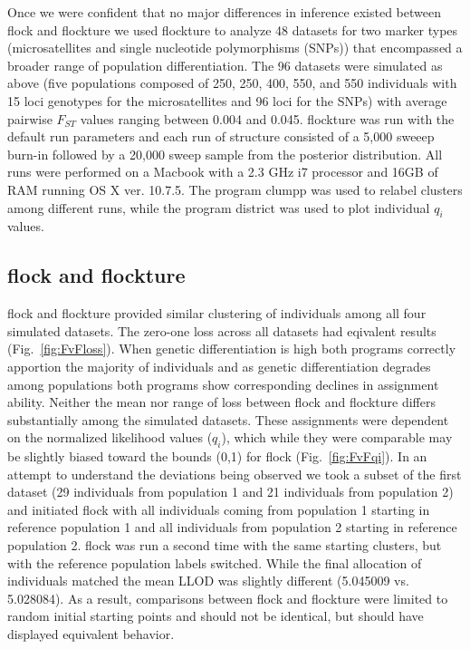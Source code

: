 Once we were confident that no major differences in inference existed between 
{\sc flock} and {\sc flockture} we used {\sc flockture} to analyze 48 datasets for two marker types 
(microsatellites and single nucleotide polymorphisms (SNPs))  that encompassed a broader 
range of population differentiation. The 96 datasets were simulated as above (five populations 
composed of 250, 250, 400, 550, and 550 individuals with 15 loci genotypes for the microsatellites
and 96 loci for the SNPs)
with average pairwise $F_{ST}$ values ranging between 0.004 and 0.045. 
 {\sc flockture} was run with the default run parameters and each run of 
{\sc structure} consisted of a 5,000 sweeep burn-in followed by a 20,000 sweep sample
from the posterior distribution. All runs were performed on a Macbook with a 2.3 GHz i7 processor
and 16GB of RAM running OS X ver. 10.7.5. The program {\sc clumpp} \citep{Jak&Ros2007} 
was used to relabel clusters among different runs,
while the program {\sc district} \citep{Rosenberg2004} was used to plot individual \textit{$q_i$} values.

\subsection*{{\sc flock} and {\sc flockture}} 
{\sc flock} and {\sc flockture} provided similar clustering of individuals among all four 
simulated datasets. The zero-one loss across all datasets had eqivalent results (Fig.~\ref{fig:FvFloss}).
When genetic differentiation is high both programs correctly apportion the majority of individuals and 
as genetic differentiation degrades among populations both programs show corresponding declines in 
assignment ability. Neither the mean nor range of loss between {\sc flock} and {\sc flockture} differs
substantially among the simulated datasets. These assignments were dependent on the normalized likelihood
values ($q_i$), which while they were comparable may be slightly biased toward the bounds (0,1)
for {\sc flock} (Fig.~\ref{fig:FvFqi}). In an attempt to understand the 
deviations being observed we took a subset of the 
first dataset (29 individuals from population 1 and 21 individuals from population 2) and initiated 
{\sc flock} with all individuals coming from population 1 starting in reference population 1 and all 
individuals from population 2 starting in reference population 2. {\sc flock} was run a second time
with the same starting clusters, but with the reference population labels switched. While the final allocation
of individuals matched the mean LLOD was slightly different (5.045009 vs. 5.028084). As a result, comparisons
between {\sc flock} and {\sc flockture} were limited to random initial starting points and should not 
be identical, but should have displayed equivalent behavior. 

